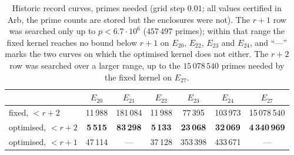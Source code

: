 \documentclass[11pt]{amsart}
\theoremstyle{remark}
\theoremstyle{definition}
\begin{document}
\begin{table}[h]
\centering\small
\begin{tabular}{lcccccc}
\toprule
 & $E_{20}$ & $E_{21}$ & $E_{22}$ & $E_{23}$ & $E_{24}$ & $E_{27}$\\
\midrule
fixed, $<r+2$ & 11\,988 & 181\,084 & 11\,988 & 77\,395 & 103\,973 & 15\,078\,540\\
optimised, $<r+2$ & \textbf{5\,515} & \textbf{83\,298} & \textbf{5\,133} & \textbf{23\,068} & \textbf{32\,069} & \textbf{4\,340\,969}\\
optimised, $<r+1$ & 47\,114 & --- & 37\,128 & 353\,398 & 433\,671 & ---\\
\bottomrule
\end{tabular}
\caption{Historic record curves, primes needed (grid step $0.01$; all values certified in Arb, the prime counts are stored but the enclosures were not). The $r+1$ row was
searched only up to $p<6.7\cdot10^6$ ($457\,497$ primes); within that range the fixed kernel reaches no
bound below $r+1$ on $E_{20}$, $E_{22}$, $E_{23}$ and $E_{24}$, and ``---'' marks the two curves on which the optimised kernel does
not either. The $r+2$ row was searched over a larger range, up to the $15\,078\,540$ primes needed by the fixed kernel on $E_{27}$.}
\label{tab:historic}
\end{table}
\end{document}

